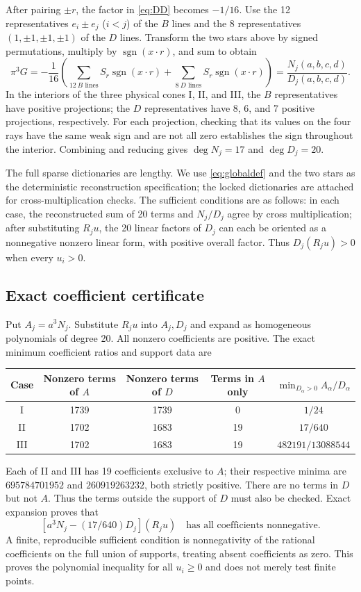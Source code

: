 \documentclass[11pt,a4paper]{article}
\theoremstyle{remark}\newtheorem{remark}[theorem]{Remark}
\newcommand{\1}{\mathbf1}\newcommand{\pos}[1]{(#1)_+}
\DeclareMathOperator{\sgn}{sgn}\DeclareMathOperator{\rank}{rank}
\begin{document}
After pairing $\pm r$, the factor in \eqref{eq:DD} becomes $-1/16$. Use the 12 representatives $e_i\pm e_j$ ($i<j$) of the $B$ lines and the 8 representatives $(1,\pm1,\pm1,\pm1)$ of the $D$ lines. Transform the two stars above by signed permutations, multiply by $\sgn(x\cdot r)$, and sum to obtain
\begin{equation}\label{eq:globaldef}
 \pi^3G=-\frac1{16}\left(\sum_{12\ B\text{ lines}}S_r\sgn(x\cdot r)
 +\sum_{8\ D\text{ lines}}S_r\sgn(x\cdot r)\right)
 =\frac{N_j(a,b,c,d)}{D_j(a,b,c,d)}.
\end{equation}
In the interiors of the three physical cones I, II, and III, the $B$ representatives have positive projections; the $D$ representatives have 8, 6, and 7 positive projections, respectively. For each projection, checking that its values on the four rays have the same weak sign and are not all zero establishes the sign throughout the interior. Combining and reducing gives $\deg N_j=17$ and $\deg D_j=20$.

The full sparse dictionaries are lengthy. We use \eqref{eq:globaldef} and the two stars as the deterministic reconstruction specification; the locked dictionaries are attached for cross-multiplication checks. The sufficient conditions are as follows: in each case, the reconstructed sum of 20 terms and $N_j/D_j$ agree by cross multiplication; after substituting $R_ju$, the 20 linear factors of $D_j$ can each be oriented as a nonnegative nonzero linear form, with positive overall factor. Thus $D_j(R_ju)>0$ when every $u_i>0$.

\subsection{Exact coefficient certificate}
Put $A_j=a^3N_j$. Substitute $R_ju$ into $A_j,D_j$ and expand as homogeneous polynomials of degree 20. All nonzero coefficients are positive. The exact minimum coefficient ratios and support data are
\begin{center}
\begin{tabular}{ccccc}\toprule
Case&Nonzero terms of $A$&Nonzero terms of $D$&Terms in $A$ only&$\min_{D_\alpha>0}A_\alpha/D_\alpha$\\\midrule
I&1739&1739&0&$1/24$\\
II&1702&1683&19&$17/640$\\
III&1702&1683&19&$482191/13088544$\\\bottomrule
\end{tabular}
\end{center}
Each of II and III has 19 coefficients exclusive to $A$; their respective minima are $695784701952$ and $260919263232$, both strictly positive. There are no terms in $D$ but not $A$. Thus the terms outside the support of $D$ must also be checked. Exact expansion proves that
\begin{equation}\label{eq:minpoly}
 [a^3N_j-(17/640)D_j](R_ju)
 \quad\text{has all coefficients nonnegative}.
\end{equation}
A finite, reproducible sufficient condition is nonnegativity of the rational coefficients on the full union of supports, treating absent coefficients as zero. This proves the polynomial inequality for all $u_i\ge0$ and does not merely test finite points.
\end{document}

